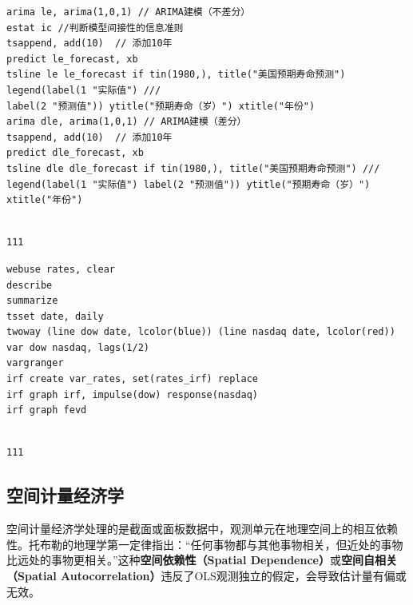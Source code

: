 \begin{tcolorbox}[title=在 Stata 中应用单变量时间序列分析, colback=white, colframe=black, colbacktitle=white, coltitle=black,fonttitle=\bfseries]
\begin{lstlisting}[xleftmargin=2em, commentstyle=\color{black}]
arima le, arima(1,0,1) // ARIMA建模（不差分）
estat ic //判断模型间接性的信息准则
tsappend, add(10)  // 添加10年
predict le_forecast, xb
tsline le le_forecast if tin(1980,), title("美国预期寿命预测") legend(label(1 "实际值") ///
label(2 "预测值")) ytitle("预期寿命（岁）") xtitle("年份")
arima dle, arima(1,0,1) // ARIMA建模（差分）
tsappend, add(10)  // 添加10年
predict dle_forecast, xb
tsline dle dle_forecast if tin(1980,), title("美国预期寿命预测") ///
legend(label(1 "实际值") label(2 "预测值")) ytitle("预期寿命（岁）") xtitle("年份")

\end{lstlisting}
\vspace{-2em}
\begin{Verbatim}[commandchars=\\\{\},xleftmargin=2em]

111
\end{Verbatim}
\end{tcolorbox}

\begin{tcolorbox}[title=在 Stata 中应用多变量时间序列分析, colback=white, colframe=black, colbacktitle=white, coltitle=black,fonttitle=\bfseries]
\begin{lstlisting}[xleftmargin=2em, commentstyle=\color{black}]
webuse rates, clear
describe
summarize
tsset date, daily
twoway (line dow date, lcolor(blue)) (line nasdaq date, lcolor(red))
var dow nasdaq, lags(1/2)
vargranger
irf create var_rates, set(rates_irf) replace
irf graph irf, impulse(dow) response(nasdaq)
irf graph fevd
\end{lstlisting}
\vspace{-2em}
\begin{Verbatim}[commandchars=\\\{\},xleftmargin=2em]

111
\end{Verbatim}
\end{tcolorbox}

\subsection{空间计量经济学}
空间计量经济学处理的是截面或面板数据中，观测单元在地理空间上的相互依赖性。托布勒的地理学第一定律指出：“任何事物都与其他事物相关，但近处的事物比远处的事物更相关。”这种\textbf{空间依赖性（Spatial Dependence）}或\textbf{空间自相关（Spatial Autocorrelation）}违反了OLS观测独立的假定，会导致估计量有偏或无效。


